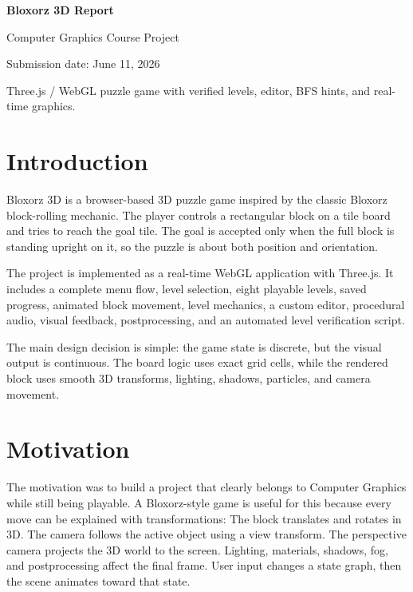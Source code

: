 \documentclass[11pt,a4paper]{article}
\begin{document}
\begin{titlepage}
  \vspace*{28mm}
  {\Huge\bfseries Bloxorz 3D Report\par}
  \vspace{6mm}
  {\Large Computer Graphics Course Project\par}
  \vspace{10mm}
  {\large Submission date: June 11, 2026\par}
  \vfill
  {\large Three.js / WebGL puzzle game with verified levels, editor, BFS hints, and real-time graphics.\par}
\end{titlepage}

\section{Introduction}

Bloxorz 3D is a browser-based 3D puzzle game inspired by the classic Bloxorz block-rolling mechanic. The player controls a rectangular block on a tile board and tries to reach the goal tile. The goal is accepted only when the full block is standing upright on it, so the puzzle is about both position and orientation.

The project is implemented as a real-time WebGL application with Three.js. It includes a complete menu flow, level selection, eight playable levels, saved progress, animated block movement, level mechanics, a custom editor, procedural audio, visual feedback, postprocessing, and an automated level verification script.

The main design decision is simple: the game state is discrete, but the visual output is continuous. The board logic uses exact grid cells, while the rendered block uses smooth 3D transforms, lighting, shadows, particles, and camera movement.

\section{Motivation}

The motivation was to build a project that clearly belongs to Computer Graphics while still being playable. A Bloxorz-style game is useful for this because every move can be explained with transformations:
The block translates and rotates in 3D.
The camera follows the active object using a view transform.
The perspective camera projects the 3D world to the screen.
Lighting, materials, shadows, fog, and postprocessing affect the final frame.
User input changes a state graph, then the scene animates toward that state.
\end{document}
